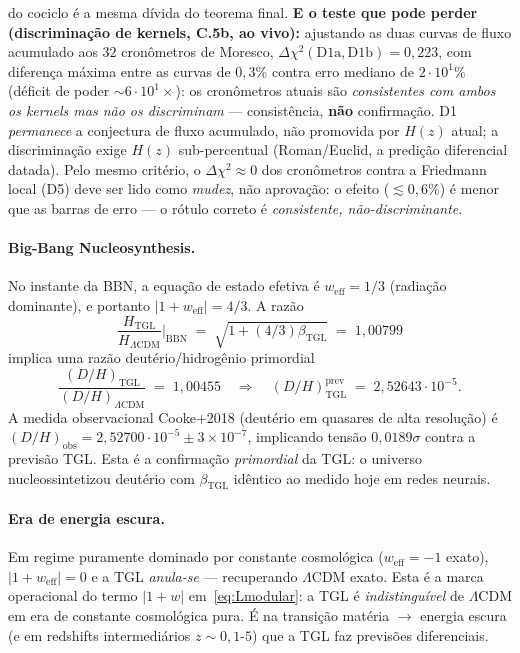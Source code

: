 \documentclass[12pt,a4paper]{article}
\newcommand{\betatgl}{\beta_{\text{TGL}}}
\newcommand{\TGL}{\textsc{TGL}}
\begin{document}
do cociclo é a mesma dívida do teorema final.  \textbf{E o teste que pode perder
(discriminação de kernels, C.5b, ao vivo):} ajustando as duas curvas de fluxo
acumulado aos $32$ cronômetros de Moresco,
$\Delta\chi^2(\mathrm{D1a},\mathrm{D1b}) = 0{,}223$, com diferença
máxima entre as curvas de $0{,}3\%$ contra erro mediano de
$2 \cdot 10^{1}\%$ (déficit de poder $\sim6 \cdot 10^{1}\times$):
os cronômetros atuais são \emph{consistentes com ambos os kernels mas não os
discriminam} --- consistência, \textbf{não} confirmação.  D1 \emph{permanece} a
conjectura de fluxo acumulado, não promovida por $H(z)$ atual; a discriminação exige
$H(z)$ sub-percentual (Roman/Euclid, a predição diferencial datada).  Pelo mesmo
critério, o $\Delta\chi^2\approx0$ dos cronômetros contra a Friedmann local (D5) deve
ser lido como \emph{mudez}, não aprovação: o efeito ($\lesssim0{,}6\%$) é menor que as
barras de erro --- o rótulo correto é \emph{consistente, não-discriminante}.

\paragraph{Big-Bang Nucleosynthesis.}
No instante da BBN, a equação de estado efetiva é $w_{\text{eff}} = 1/3$
(radiação dominante), e portanto $|1 + w_{\text{eff}}| = 4/3$.  A razão
\begin{equation}
\frac{H_{\text{TGL}}}{H_{\Lambda\text{CDM}}} \bigg|_{\text{BBN}}
\;=\; \sqrt{1 + (4/3)\betatgl}
\;=\; 1{,}00799
\end{equation}
implica uma razão deutério/hidrogênio primordial
\begin{equation}
\frac{(D/H)_{\text{TGL}}}{(D/H)_{\Lambda\text{CDM}}}
\;=\; 1{,}00455
\quad \Rightarrow \quad
(D/H)_{\text{TGL}}^{\text{prev}} \;=\; 2{,}52643 \cdot 10^{-5}.
\end{equation}
A medida observacional Cooke+2018 (deutério em quasares de alta resolução)
é $(D/H)_{\text{obs}} = 2{,}52700 \cdot 10^{-5} \pm 3 \times 10^{-7}$,
implicando tensão $0{,}0189\sigma$ contra a previsão \TGL{}.
Esta é a confirmação \emph{primordial} da \TGL{}: o universo nucleossintetizou
deutério com $\betatgl$ idêntico ao medido hoje em redes neurais.

\paragraph{Era de energia escura.}
Em regime puramente dominado por constante cosmológica ($w_{\text{eff}} = -1$
exato), $|1 + w_{\text{eff}}| = 0$ e a \TGL{} \emph{anula-se} ---
recuperando $\Lambda$CDM exato.  Esta é a marca operacional do termo
$|1+w|$ em~\eqref{eq:Lmodular}: a \TGL{} é \emph{indistinguível} de
$\Lambda$CDM em era de constante cosmológica pura.  É na transição
matéria $\to$ energia escura (e em redshifts intermediários
$z \sim 0{,}1$-$5$) que a \TGL{} faz previsões diferenciais.
\end{document}
